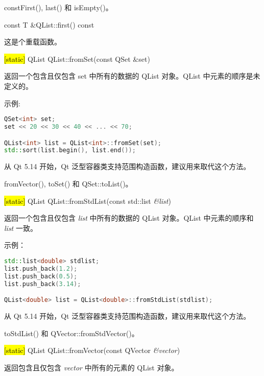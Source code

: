 \begin{seeAlso}
constFirst(), last() 和 isEmpty()。
\end{seeAlso}

const T \&QList::first() const

这是个重载函数。

\hl{[static]} QList QList::fromSet(const QSet \&set)

返回一个包含且仅包含 set 中所有的数据的 QList 对象。QList 中元素的顺序是未定义的。

示例:


\begin{lstlisting}[language=C++]
QSet<int> set;
set << 20 << 30 << 40 << ... << 70;

QList<int> list = QList<int>::fromSet(set);
std::sort(list.begin(), list.end());
\end{lstlisting}

\begin{notice}
从 Qt 5.14 开始，Qt 泛型容器类支持范围构造函数，建议用来取代这个方法。
\end{notice}


\begin{seeAlso}
fromVector(), toSet() 和 QSet::toList()。
\end{seeAlso}


\hl{[static]} QList QList::fromStdList(const std::list \emph{\&list})

返回一个包含且仅包含 \emph{list} 中所有的数据的 QList 对象。QList 中元素的顺序和 \emph{list} 一致。

示例：


\begin{lstlisting}[language=C++]
std::list<double> stdlist;
list.push_back(1.2);
list.push_back(0.5);
list.push_back(3.14);

QList<double> list = QList<double>::fromStdList(stdlist);
\end{lstlisting}


\begin{notice}
从 Qt 5.14 开始，Qt 泛型容器类支持范围构造函数，建议用来取代这个方法。
\end{notice}


\begin{seeAlso}
toStdList() 和 QVector::fromStdVector()。
\end{seeAlso}


\hl{[static]} QList QList::fromVector(const QVector \emph{\&vector})

返回包含且仅包含 \emph{vector} 中所有的元素的 QList 对象。

